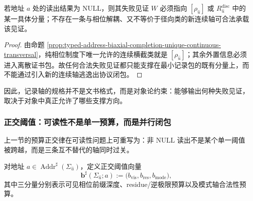 \begin{proposition}[见证必须落在记录轴支撑上]\label{prop:typed-address-biaxial-completion-witness-support}
若地址 \(a\) 处的读出结果为 \(\mathrm{NULL}\)，则其失败见证 \(W\) 必须指向 \([\rho_{\hat u}]\) 或 \(R^{\mathrm{disc}}_{\hat u}\) 中的某一具体分量；不存在一条与相位解耦、又不等价于径向类的新连续轴可合法承载该见证。
\end{proposition}
\begin{proof}
由命题 \ref{prop:typed-address-biaxial-completion-unique-continuous-transversal}，纯相位制度下唯一允许的连续横截类就是 \([\rho_{\hat u}]\)；其余外置信息必须进入离散证书包。故任何合法失败见证都只能支撑在最小记录包的既有分量上，而不能通过引入新的连续轴逃逸出协议闭包。
\end{proof}

因此，记录轴的规格并不是文书格式，而是对象论约束：能够输出何种失败见证，取决于对象中真正允许了哪些支撑方向。

\subsubsection{正交阈值：可读性不是单一预算，而是并行闭包}\label{subsubsec:typed-address-biaxial-completion-readability-thresholds}
上一节的预算正交律在可读性问题上可重写为：非 \(\mathrm{NULL}\) 读出不是某个单一阈值被跨越，而是三条互不替代的轴同时过关。

\begin{definition}[正交阈值向量]\label{def:typed-address-biaxial-completion-readability-threshold-vector}
对地址 \(a\in \operatorname{Addr}^{\sharp}(\Sigma_{\hat u})\)，定义正交阈值向量
\[
\mathbf b^\sharp(\Sigma_{\hat u};a)
:=
\bigl(
b_{\mathrm{vis}},
b_{\mathrm{res}},
b_{\mathrm{mode}}
\bigr),
\]
其中三分量分别表示可见相位前缀深度、residue/逆极限预算以及模式轴合法性预算。
\end{definition}

